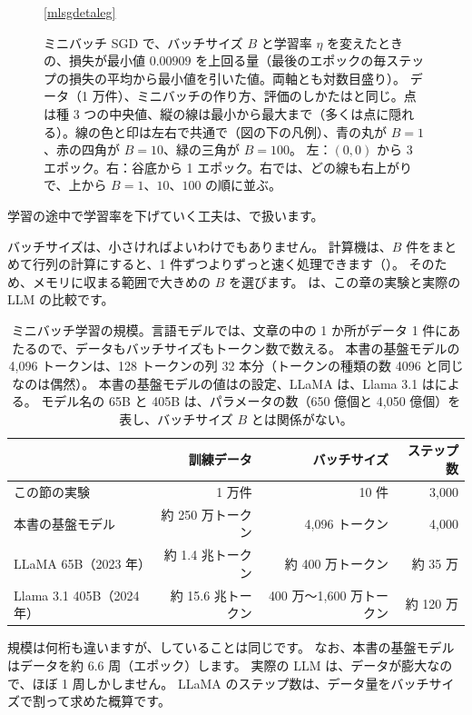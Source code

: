 \begin{figure}[tbp]
\vspace{1mm}
\ref{mlsgdetaleg}
\caption{ミニバッチ SGD で、バッチサイズ $B$ と学習率 $\eta$ を変えたときの、損失が最小値 $0.00909$ を上回る量（最後のエポックの毎ステップの損失の平均から最小値を引いた値。両軸とも対数目盛り）。
データ（1 万件）、ミニバッチの作り方、評価のしかたはと同じ。点は種 3 つの中央値、縦の線は最小から最大まで（多くは点に隠れる）。線の色と印は左右で共通で（図の下の凡例）、青の丸が $B=1$、赤の四角が $B=10$、緑の三角が $B=100$。
左：$(0,0)$ から 3 エポック。右：谷底から 1 エポック。右では、どの線も右上がりで、上から $B=1$、$10$、$100$ の順に並ぶ。}
\label{fig:ml-sgd-eta}
\end{figure}
学習の途中で学習率を下げていく工夫は、で扱います。

バッチサイズは、小さければよいわけでもありません。
計算機は、$B$ 件をまとめて行列の計算にすると、1 件ずつよりずっと速く処理できます（）。
そのため、メモリに収まる範囲で大きめの $B$ を選びます。
は、この章の実験と実際の LLM の比較です。

\begin{table}[tbp]
\centering
\caption{ミニバッチ学習の規模。言語モデルでは、文章の中の 1 か所がデータ 1 件にあたるので、データもバッチサイズもトークン数で数える。
本書の基盤モデルの 4,096 トークンは、128 トークンの列 32 本分（トークンの種類の数 4096 と同じなのは偶然）。
本書の基盤モデルの値はの設定、LLaMA は\cite{touvron2023llama}、Llama 3.1 は\cite{dubey2024llama3}による。
モデル名の 65B と 405B は、パラメータの数（650 億個と 4,050 億個）を表し、バッチサイズ $B$ とは関係がない。}
\label{tab:ml-scale}
\small
\begin{tabular}{lrrr}
\toprule
 & 訓練データ & バッチサイズ & ステップ数 \\
\midrule
この節の実験 & 1 万件 & 10 件 & 3,000 \\
本書の基盤モデル & 約 250 万トークン & 4,096 トークン & 4,000 \\
LLaMA 65B（2023 年） & 約 1.4 兆トークン & 約 400 万トークン & 約 35 万 \\
Llama 3.1 405B（2024 年） & 約 15.6 兆トークン & 400 万〜1,600 万トークン & 約 120 万 \\
\bottomrule
\end{tabular}
\end{table}

規模は何桁も違いますが、していることは同じです。
なお、本書の基盤モデルはデータを約 6.6 周（エポック）します。
実際の LLM は、データが膨大なので、ほぼ 1 周しかしません。
LLaMA のステップ数は、データ量をバッチサイズで割って求めた概算です。

